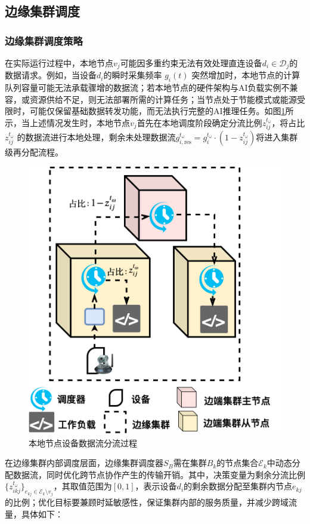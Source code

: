 \subsection{边缘集群调度}

\subsubsection{边缘集群调度策略}

在实际运行过程中，本地节点$v_j$可能因多重约束无法有效处理直连设备$d_i \in \mathcal{D}_j$的数据请求。例如，当设备$d_i$的瞬时采集频率 $g_i(t)$ 突然增加时，本地节点的计算队列容量可能无法承载骤增的数据流；若本地节点的硬件架构与AI负载实例不兼容，或资源供给不足，则无法部署所需的计算任务；当节点处于节能模式或能源受限时，可能仅保留基础数据转发功能，而无法执行完整的AI推理任务。如图\ref{fig:3-9edgecluster}所示，当上述情况发生时，本地节点$v_j$首先在本地调度阶段确定分流比例$z_{ij}^{t_\omega}$，将占比  $z_{ij}^{t_\omega}$ 的数据流进行本地处理，剩余未处理数据流$g_{i,\text{res}}^{t_\omega} = g_i^{t_\omega} \cdot (1 - z_{ij}^{t_\omega})$将进入集群级再分配流程。

\begin{figure}[h]
  \centering
  \includegraphics[width=0.5\linewidth]{pics/3-9集群内部调度.png}
  \caption{本地节点设备数据流分流过程}
  \label{fig:3-9edgecluster}
\end{figure}

在边缘集群内部调度层面，边缘集群调度器$S_B$需在集群$B_k$的节点集合$\mathcal{E}_k$中动态分配数据流，同时优化跨节点协作产生的传输开销。其中，决策变量为剩余分流比例$\{z_{ikj}^{t_\omega}\}_{e_{kj} \in \mathcal{E}_k \setminus v_j}$，其取值范围为$[0,1]$，表示设备$d_i$的剩余数据分配至集群内节点$e_{kj}$的比例；优化目标要兼顾时延敏感性，保证集群内部的服务质量，并减少跨域流量，具体如下：

